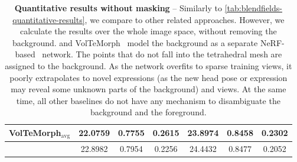\begin{table}[!t]
{\begin{tabular}{lcccccc}
      VolTeMorph$_\text{avg}$\cite{garbin2024voltemorph} & \cellcolor{secondbestcolor}22.0759     & \cellcolor{secondbestcolor}0.7755        & \cellcolor{secondbestcolor}0.2615 & \cellcolor{secondbestcolor}23.8974 & \cellcolor{secondbestcolor}0.8458 & 0.2302                            \\
      \midrule
      \textbf{\methodname{}}                             & \cellcolor{firstbestcolor}22.8982      & \cellcolor{firstbestcolor}0.7954         & \cellcolor{firstbestcolor}0.2256  & \cellcolor{firstbestcolor}24.4432  & \cellcolor{firstbestcolor}0.8477  & \cellcolor{firstbestcolor}0.2052  \\
      \bottomrule
    \end{tabular}
  }
  \caption[Additional quantitative evaluation between \blendfields and chosen baselines]{\textbf{Quantitative results without masking} --
    Similarly to \cref{tab:blendfields-quantitative-results}, we compare \blendfields to other related approaches.
    However, we calculate the results over the whole image space, without removing
    the background.
    \blendfields and VolTeMorph~\cite{garbin2024voltemorph} model the background as a separate NeRF-based~\cite{mildenhall2020nerf} network.
    The points that do not fall into the tetrahedral mesh are assigned to the
    background.
    As the network overfits to sparse training views, it poorly extrapolates to
    novel expressions (as the new head pose or expression may reveal some unknown
    parts of the background) and views.
    At the same time, all other baselines do not have any mechanism to
    disambiguate the background and the foreground.
  }
  \label{tab:blendfields-quantitative-results-without-masking}
\end{table}